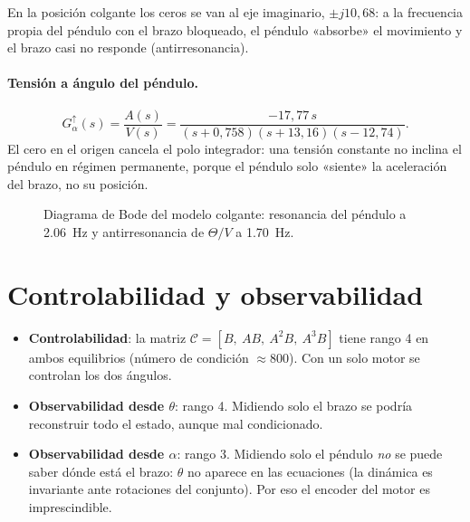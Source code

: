 En la posición colgante los ceros se van al eje imaginario, $\pm j10{,}68$: a la frecuencia propia del péndulo con el brazo bloqueado, el péndulo «absorbe» el movimiento y el brazo casi no responde (antirresonancia).

\paragraph{Tensión a ángulo del péndulo.}
\begin{equation}
  G_\alpha^\uparrow(s)=\frac{A(s)}{V(s)} = \frac{-17{,}77\,s}{(s+0{,}758)(s+13{,}16)(s-12{,}74)} .
\end{equation}
El cero en el origen cancela el polo integrador: una tensión constante no inclina el péndulo en régimen permanente, porque el péndulo solo «siente» la aceleración del brazo, no su posición.

\begin{figure}[H]
\centering
{}
\caption{Diagrama de Bode del modelo colgante: resonancia del péndulo a \SI{2.06}{Hz} y antirresonancia de $\Theta/V$ a \SI{1.70}{Hz}.}
\label{fig:bode}
\end{figure}

\section{Controlabilidad y observabilidad}

\begin{itemize}
  \item \textbf{Controlabilidad}: la matriz $\mathcal C=[B,\ AB,\ A^2B,\ A^3B]$ tiene rango 4 en ambos equilibrios (número de condición $\approx800$). Con un solo motor se controlan los dos ángulos.
  \item \textbf{Observabilidad desde $\theta$}: rango 4. Midiendo solo el brazo se podría reconstruir todo el estado, aunque mal condicionado.
  \item \textbf{Observabilidad desde $\alpha$}: rango 3. Midiendo solo el péndulo \emph{no} se puede saber dónde está el brazo: $\theta$ no aparece en las ecuaciones (la dinámica es invariante ante rotaciones del conjunto). Por eso el encoder del motor es imprescindible.
\end{itemize}
